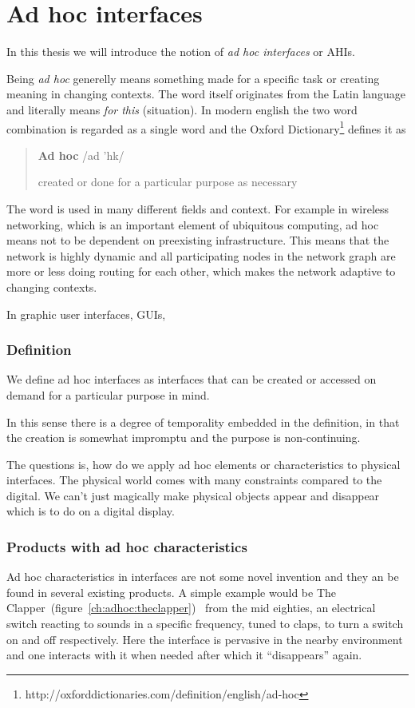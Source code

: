 \section{Ad hoc interfaces}

In this thesis we will introduce the notion of \emph{ad hoc interfaces} or AHIs.

Being \emph{ad hoc} generelly means something made for a specific task or creating meaning in changing contexts.
The word itself originates from the Latin language and literally means \emph{for this} (situation). 
In modern english the two word combination is regarded as a single word and the Oxford Dictionary\footnote{http://oxforddictionaries.com/definition/english/ad-hoc} defines it as

\begin{quotation}
\textbf{Ad hoc}  /ad 'h\textturnscripta k/

created or done for a particular purpose as necessary
\end{quotation}

The word is used in many different fields and context.
For example in wireless networking, which is an important element of ubiquitous computing, ad hoc means not to be dependent on preexisting infrastructure.
This means that the network is highly dynamic and all participating nodes in the network graph are more or less doing routing for each other, which makes the network adaptive to changing contexts.

In graphic user interfaces, GUIs,  



\subsubsection{Definition} 
We define ad hoc interfaces as  interfaces that can be created or accessed on demand for a particular purpose in mind. 

In this sense there is a degree of temporality embedded in the definition, in that the creation is somewhat impromptu and the purpose is non-continuing.

The questions is, how do we apply ad hoc elements or characteristics to physical interfaces.
The physical world comes with many constraints compared to the digital.
We can't just magically make physical objects appear and disappear which is to do on a digital display.

\subsubsection{Products with ad hoc characteristics}
Ad hoc characteristics in interfaces are not some novel invention and they an be found in several existing products.
A simple example would be The Clapper~(figure~\ref{ch:adhoc:theclapper})~\cite{theclapperWIKIPEDIA} from the mid eighties, an electrical switch reacting to sounds in a specific frequency, tuned to claps, to turn a switch on and off respectively.
Here the interface is pervasive in the nearby environment and one interacts with it when needed after which it ``disappears'' again.

